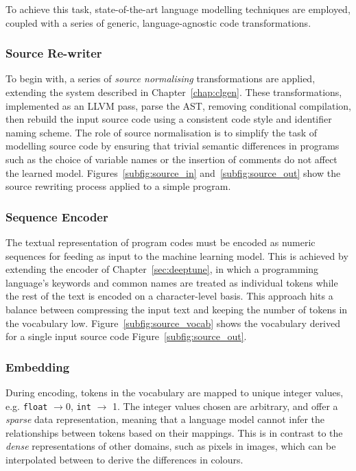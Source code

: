To achieve this task, state-of-the-art language modelling techniques are employed, coupled with a series of generic, language-agnostic code transformations.

\subsubsection{Source Re-writer}

To begin with, a series of \emph{source normalising} transformations are applied, extending the system described in Chapter~\ref{chap:clgen}. These transformations, implemented as an LLVM pass, parse the AST, removing conditional compilation, then rebuild the input source code using a consistent code style and identifier naming scheme. The role of source normalisation is to simplify the task of modelling source code by ensuring that trivial semantic differences in programs such as the choice of variable names or the insertion of comments do not affect the learned model. Figures~\ref{subfig:source_in} and~\ref{subfig:source_out} show the source rewriting process applied to a simple program.

\subsubsection{Sequence Encoder}

The textual representation of program codes must be encoded as numeric sequences for feeding as input to the machine learning model. This is achieved by extending the encoder of Chapter~\ref{sec:deeptune}, in which a programming language's keywords and common names are treated as individual tokens while the rest of the text is encoded on a character-level basis. This approach hits a balance between compressing the input text and keeping the number of tokens in the vocabulary low. Figure~\ref{subfig:source_vocab} shows the vocabulary derived for a single input source code Figure~\ref{subfig:source_out}.

\subsubsection{Embedding}

During encoding, tokens in the vocabulary are mapped to unique integer values, e.g. \texttt{float} $\rightarrow 0$, \texttt{int} $\rightarrow$ 1. The integer values chosen are arbitrary, and offer a \emph{sparse} data representation, meaning that a language model cannot infer the relationships between tokens based on their mappings. This is in contrast to the \emph{dense} representations of other domains, such as pixels in images, which can be interpolated between to derive the differences in colours.

